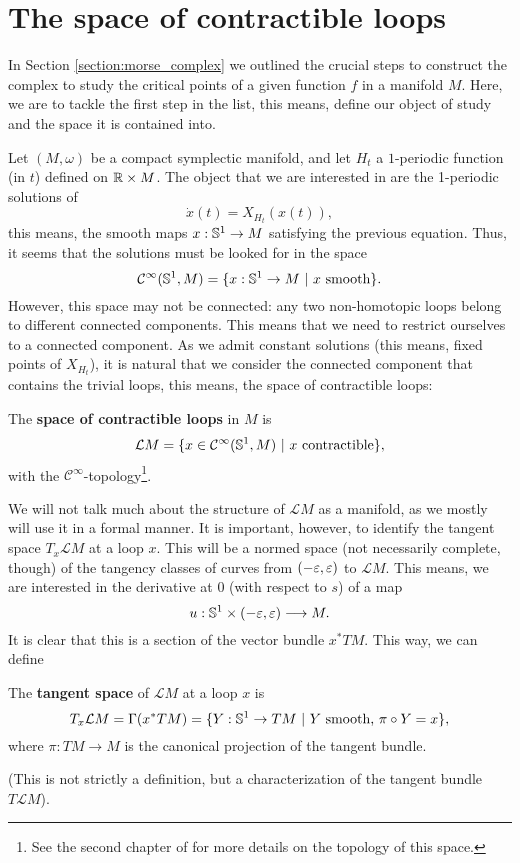\section{The space of contractible loops} \label{section:floerq_loops}

In Section \ref{section:morse_complex} we outlined the crucial steps to construct the complex to study the critical points of a given function $f$ in a manifold $M$. Here, we are to tackle the first step in the list, this means, define our object of study and the space it is contained into.

Let $(M,\omega)$ be a compact symplectic manifold, and let $H_t$ a $1$-periodic function (in $t$) defined on $\mathbb{R} \times M$. The object that we are interested in are the 1-periodic solutions of
\[\dot{x}(t) = X_{H_t}(x(t)) ,\]
this means, the smooth maps $x : \mathbb{S}^1 \rightarrow M$ satisfying the previous equation. Thus, it seems that the solutions must be looked for in the space
\[\mathcal{C}^{\infty}(\mathbb{S}^1,M) = \{ x : \mathbb{S}^1 \rightarrow M \ | \ x \text{ smooth} \} .\]
However, this space may not be connected: any two non-homotopic loops belong to different connected components. This means that we need to restrict ourselves to a connected component. As we admit constant solutions (this means, fixed points of $X_{H_t}$), it is natural that we consider the connected component that contains the trivial loops, this means, the space of contractible loops:

\begin{deff}
The {\bf space of contractible loops} in $M$ is
\[\mathcal{L}M = \{ x \in \mathcal{C}^{\infty}(\mathbb{S}^1,M) \ | \ x \text{ contractible} \} ,\]
with the $\mathcal{C}^{\infty}$-topology\footnote{See the second chapter of \cite{hirsch2012differential} for more details on the topology of this space.}.
\end{deff}

We will not talk much about the structure of $\mathcal{L}M$ as a manifold, as we mostly will use it in a formal manner. It is important, however, to identify the tangent space $T_x\mathcal{L}M$ at a loop $x$. This will be a normed space (not necessarily complete, though) of the tangency classes of curves from $(-\varepsilon,\varepsilon)$ to $\mathcal{L}M$. This means, we are interested in the derivative at $0$ (with respect to $s$) of a map
\[u : \mathbb{S}^1 \times (-\varepsilon,\varepsilon) \longrightarrow M .\]
It is clear that this is a section of the vector bundle $x^{\ast}TM$. This way, we can define

\begin{deff}
The {\bf tangent space} of $\mathcal{L}M$ at a loop $x$ is
\[T_x\mathcal{L}M = \Gamma(x^{\ast}TM) = \{ Y : \mathbb{S}^1 \rightarrow TM \ | \ Y \text{ smooth, } \pi \circ Y = x\},\]
where $\pi : TM \rightarrow M$ is the canonical projection of the tangent bundle.
\end{deff}

(This is not strictly a definition, but a characterization of the tangent bundle $T\mathcal{L}M$).

